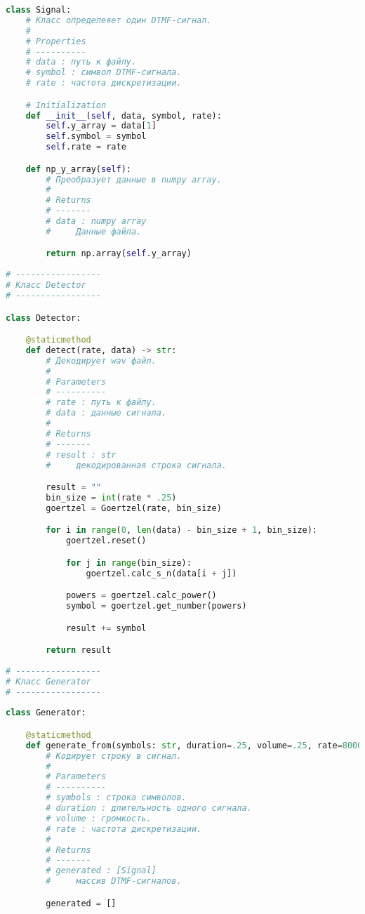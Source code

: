 \begin{lstlisting}[language=python]
 class Signal:
    # Класс определеяет один DTMF-сигнал.
    #
    # Properties
    # ----------
    # data : путь к файлу.
    # symbol : символ DTMF-сигнала.
    # rate : частота дискретизации.

    # Initialization
    def __init__(self, data, symbol, rate):
        self.y_array = data[1]
        self.symbol = symbol
        self.rate = rate

    def np_y_array(self):
        # Преобразует данные в numpy array.
        #
        # Returns
        # -------
        # data : numpy array
        #     Данные файла.

        return np.array(self.y_array)
        	
# -----------------
# Класс Detector
# -----------------

class Detector:

    @staticmethod
    def detect(rate, data) -> str:
        # Декодирует wav файл.
        # 
        # Parameters
        # ----------
        # rate : путь к файлу.
        # data : данные сигнала.
        # 
        # Returns
        # -------
        # result : str
        #     декодированная строка сигнала.

        result = ""
        bin_size = int(rate * .25)
        goertzel = Goertzel(rate, bin_size)

        for i in range(0, len(data) - bin_size + 1, bin_size):
            goertzel.reset()

            for j in range(bin_size):
                goertzel.calc_s_n(data[i + j])

            powers = goertzel.calc_power()
            symbol = goertzel.get_number(powers)

            result += symbol

        return result
        
# -----------------
# Класс Generator
# -----------------
     
class Generator:

    @staticmethod
    def generate_from(symbols: str, duration=.25, volume=.25, rate=8000) -> [Signal]:
        # Кодирует строку в сигнал.
        #
        # Parameters
        # ----------
        # symbols : строка символов.
        # duration : длительность одного сигнала.
        # volume : громкость.
        # rate : частота дискретизации.
        #
        # Returns
        # -------
        # generated : [Signal]
        #     массив DTMF-сигналов.

        generated = []


\end{lstlisting}
